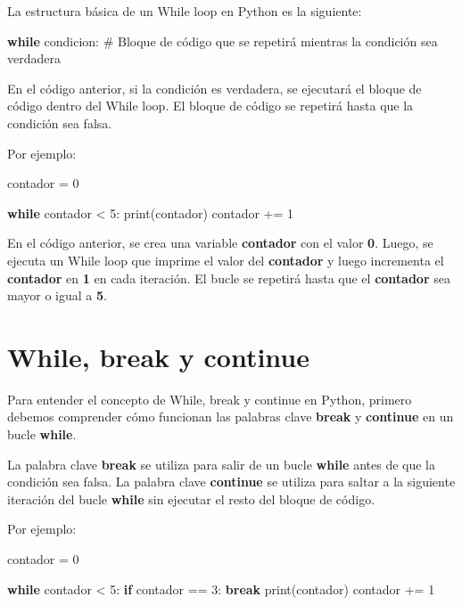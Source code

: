 \documentclass[
  a4paper,
  DIV=11,
  numbers=noendperiod,
  onepage,
  openany]{scrreprt}
\newenvironment{Shaded}{\begin{snugshade}}{\end{snugshade}}
\newcommand{\BuiltInTok}[1]{\textcolor[rgb]{0.00,0.23,0.31}{#1}}
\newcommand{\CommentTok}[1]{\textcolor[rgb]{0.37,0.37,0.37}{#1}}
\newcommand{\ControlFlowTok}[1]{\textcolor[rgb]{0.00,0.23,0.31}{\textbf{#1}}}
\newcommand{\DecValTok}[1]{\textcolor[rgb]{0.68,0.00,0.00}{#1}}
\newcommand{\NormalTok}[1]{\textcolor[rgb]{0.00,0.23,0.31}{#1}}
\newcommand{\OperatorTok}[1]{\textcolor[rgb]{0.37,0.37,0.37}{#1}}
\begin{document}
La estructura básica de un While loop en Python es la siguiente:

\begin{Shaded}
\begin{Highlighting}[]
\ControlFlowTok{while}\NormalTok{ condicion:}
    \CommentTok{\# Bloque de código que se repetirá mientras la condición sea verdadera}
\end{Highlighting}
\end{Shaded}

En el código anterior, si la condición es verdadera, se ejecutará el
bloque de código dentro del While loop. El bloque de código se repetirá
hasta que la condición sea falsa.

Por ejemplo:

\begin{Shaded}
\begin{Highlighting}[]
\NormalTok{contador }\OperatorTok{=} \DecValTok{0}

\ControlFlowTok{while}\NormalTok{ contador }\OperatorTok{\textless{}} \DecValTok{5}\NormalTok{:}
    \BuiltInTok{print}\NormalTok{(contador)}
\NormalTok{    contador }\OperatorTok{+=} \DecValTok{1}
\end{Highlighting}
\end{Shaded}

En el código anterior, se crea una variable \textbf{contador} con el
valor \textbf{0}. Luego, se ejecuta un While loop que imprime el valor
del \textbf{contador} y luego incrementa el \textbf{contador} en
\textbf{1} en cada iteración. El bucle se repetirá hasta que el
\textbf{contador} sea mayor o igual a \textbf{5}.

\section{While, break y continue}\label{while-break-y-continue}

Para entender el concepto de While, break y continue en Python, primero
debemos comprender cómo funcionan las palabras clave \textbf{break} y
\textbf{continue} en un bucle \textbf{while}.

La palabra clave \textbf{break} se utiliza para salir de un bucle
\textbf{while} antes de que la condición sea falsa. La palabra clave
\textbf{continue} se utiliza para saltar a la siguiente iteración del
bucle \textbf{while} sin ejecutar el resto del bloque de código.

Por ejemplo:

\begin{Shaded}
\begin{Highlighting}[]
\NormalTok{contador }\OperatorTok{=} \DecValTok{0}

\ControlFlowTok{while}\NormalTok{ contador }\OperatorTok{\textless{}} \DecValTok{5}\NormalTok{:}
    \ControlFlowTok{if}\NormalTok{ contador }\OperatorTok{==} \DecValTok{3}\NormalTok{:}
        \ControlFlowTok{break}
    \BuiltInTok{print}\NormalTok{(contador)}
\NormalTok{    contador }\OperatorTok{+=} \DecValTok{1}
\end{Highlighting}
\end{Shaded}
\end{document}

